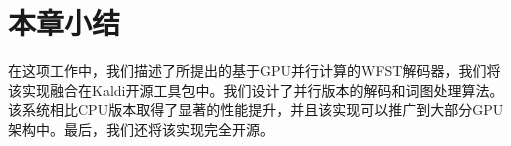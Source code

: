 \section{本章小结}
\label{chap:gpu-sum}

在这项工作中，我们描述了所提出的基于GPU并行计算的WFST解码器，我们将该实现融合在Kaldi开源工具包中。我们设计了并行版本的解码和词图处理算法。该系统相比CPU版本取得了显著的性能提升，并且该实现可以推广到大部分GPU架构中。最后，我们还将该实现完全开源。
